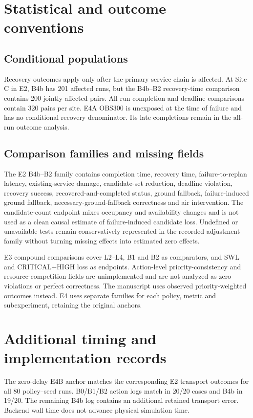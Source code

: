\documentclass[11pt,a4paper]{article}
\begin{document}
\section{Statistical and outcome conventions}

\subsection{Conditional populations}

Recovery outcomes apply only after the primary service chain is affected. At Site C in E2, B4b has 201 affected runs, but the B4b--B2 recovery-time comparison contains 200 jointly affected pairs. All-run completion and deadline comparisons contain 320 pairs per site. E4A OBS300 is unexposed at the time of failure and has no conditional recovery denominator. Its late completions remain in the all-run outcome analysis.

\subsection{Comparison families and missing fields}

The E2 B4b--B2 family contains completion time, recovery time, failure-to-replan latency, existing-service damage, candidate-set reduction, deadline violation, recovery success, recovered-and-completed status, ground fallback, failure-induced ground fallback, necessary-ground-fallback correctness and air intervention. The candidate-count endpoint mixes occupancy and availability changes and is not used as a clean causal estimate of failure-induced candidate loss. Undefined or unavailable tests remain conservatively represented in the recorded adjustment family without turning missing effects into estimated zero effects.

E3 compound comparisons cover L2--L4, B1 and B2 as comparators, and SWL and CRITICAL+HIGH loss as endpoints. Action-level priority-consistency and resource-competition fields are unimplemented and are not analyzed as zero violations or perfect correctness. The manuscript uses observed priority-weighted outcomes instead. E4 uses separate families for each policy, metric and subexperiment, retaining the original anchors.

\section{Additional timing and implementation records}

The zero-delay E4B anchor matches the corresponding E2 transport outcomes for all 80 policy--seed runs. B0/B1/B2 action logs match in 20/20 cases and B4b in 19/20. The remaining B4b log contains an additional retained transport error. Backend wall time does not advance physical simulation time.
\end{document}

